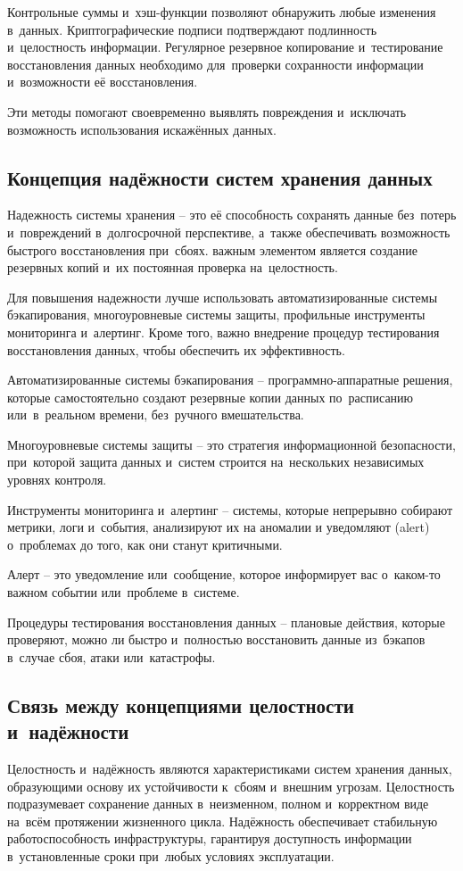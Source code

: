 \documentclass{ou}
\begin{document}
Контрольные суммы и~хэш-функции позволяют обнаружить любые изменения в~данных. Криптографические подписи подтверждают подлинность и~целостность информации. Регулярное резервное копирование и~тестирование восстановления данных необходимо для~проверки сохранности информации и~возможности её восстановления.

Эти методы помогают своевременно выявлять повреждения и~исключать возможность использования искажённых данных.
\subsection{Концепция надёжности систем хранения данных}
Надежность системы хранения -- это её способность сохранять данные без~потерь и~повреждений в~долгосрочной перспективе, а~также обеспечивать возможность быстрого восстановления при~сбоях. важным элементом является создание резервных копий и~их постоянная проверка на~целостность.

Для повышения надежности лучше использовать автоматизированные системы бэкапирования, многоуровневые системы защиты, профильные инструменты мониторинга и~алертинг. Кроме того, важно внедрение процедур тестирования восстановления данных, чтобы обеспечить их эффективность.

Автоматизированные системы бэкапирования -- программно-аппаратные решения, которые самостоятельно создают резервные копии данных по~расписанию или~в~реальном времени, без~ручного вмешательства.

Многоуровневые системы защиты -- это стратегия информационной безопасности, при~которой защита данных и~систем строится на~нескольких независимых уровнях контроля.

Инструменты мониторинга и~алертинг -- системы, которые непрерывно собирают метрики, логи и~события, анализируют их на аномалии и уведомляют (alert) о~проблемах до того, как они станут критичными.

Алерт -- это уведомление или~сообщение, которое информирует вас о~каком-то важном событии или~проблеме в~системе.

Процедуры тестирования восстановления данных -- плановые действия, которые проверяют, можно ли быстро и~полностью восстановить данные из~бэкапов в~случае сбоя, атаки или~катастрофы.
\subsection{Связь между концепциями целостности и~надёжности}
Целостность и~надёжность являются характеристиками систем хранения данных, образующими основу их устойчивости к~сбоям и~внешним угрозам. Целостность подразумевает сохранение данных в~неизменном, полном и~корректном виде на~всём протяжении жизненного цикла. Надёжность обеспечивает стабильную работоспособность инфраструктуры, гарантируя доступность информации в~установленные сроки при~любых условиях эксплуатации.
\end{document}
